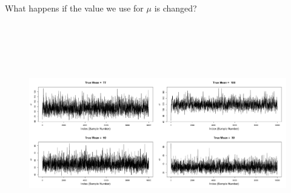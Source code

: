 \documentclass[11pt]{article}
\begin{document}
\vspace{.2in}

What happens if the value we use for $\mu$ is changed? 
\vspace{.1in}
\begin{figure}[H]
\centering
\includegraphics[width=6in,height=3.8in]{bayes_figs/Plots_differentmeans.png} 
\end{figure}

\newpage

\end{document}
